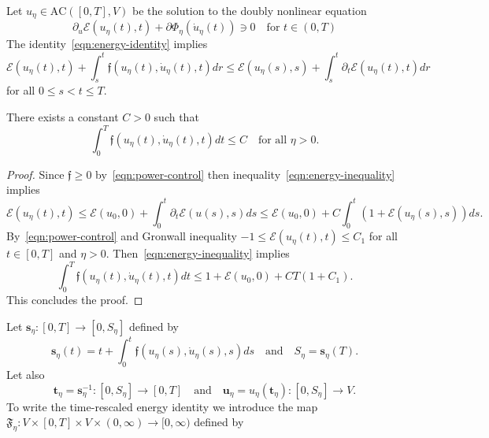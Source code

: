 Let $u_\eta\in\text{AC}([0,T],V)$ be the solution to the doubly nonlinear equation
\begin{equation*}
\partial_u\mathcal{E}(u_\eta(t),t)+\partial\Phi_\eta(\dot u_\eta(t))\ni0\quad\text{for $t\in(0,T)$}
\end{equation*}
The identity~\eqref{eqn:energy-identity} implies
\begin{equation}
\label{eqn:energy-inequality}
\mathcal{E}(u_\eta(t),t)+\int_s^t\mathfrak{f}(u_\eta(t),\dot u_\eta(t),t)dr\le\mathcal{E}(u_\eta(s),s)+\int_s^t\partial_t\mathcal{E}(u_\eta(t),t)dr
\end{equation}
for all $0\le s<t\le T$.
\begin{lemma}
\label{lemma:dissipation-bound}
There exists a constant $C>0$ such that
\begin{equation*}
\int_0^T\mathfrak{f}(u_\eta(t),\dot u_\eta(t),t)dt\le C\quad\text{for all $\eta>0$}.
\end{equation*}
\end{lemma}
\begin{proof}
Since $\mathfrak{f}\ge0$ by~\eqref{eqn:power-control} then inequality~\eqref{eqn:energy-inequality} implies
\begin{equation*}
\mathcal{E}(u_\eta(t),t)\le\mathcal{E}(u_0,0)+\int_0^t\partial_t\mathcal{E}(u(s),s)ds\le\mathcal{E}(u_0,0)+C\int_0^t(1+\mathcal{E}(u_\eta(s),s))ds.
\end{equation*}
By~\eqref{eqn:power-control} and Gronwall inequality $-1\le\mathcal{E}(u_\eta(t),t)\le C_1$ for all $t\in[0,T]$ and $\eta>0$. Then~\eqref{eqn:energy-inequality} implies
\begin{equation*}
\int_0^T\mathfrak{f}(u_\eta(t),\dot u_\eta(t),t)dt\le1+\mathcal{E}(u_0,0)+CT(1+C_1).
\end{equation*}
This concludes the proof.
\end{proof}
Let $\boldsymbol{s}_\eta\colon[0,T]\to[0,S_\eta]$ defined by
\begin{equation}
\label{eqn:energy-arc-lenght}
\boldsymbol{s}_\eta(t)=t+\int_0^t\mathfrak{f}(u_\eta(s),\dot u_\eta(s),s)ds\quad\text{and}\quad S_\eta=\boldsymbol{s}_\eta(T).
\end{equation}
Let also
\begin{equation*}
\boldsymbol{t}_\eta=\boldsymbol{s}_\eta^{-1}\colon[0,S_\eta]\to[0,T]\quad\text{and}\quad\boldsymbol{u}_\eta=u_\eta(\boldsymbol{t}_\eta)\colon[0,S_\eta]\to V.
\end{equation*}
To write the time-rescaled energy identity we introduce the map $\mathfrak{F}_\eta\colon V\times[0,T]\times V\times(0,\infty)\to[0,\infty)$ defined by
